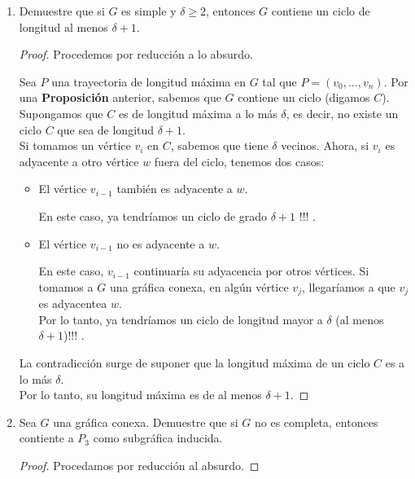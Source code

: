 \documentclass{article}
\begin{document}
\begin{enumerate}
\item Demuestre que si $G$ es simple y $\delta \ge 2$, entonces $G$ contiene
  un ciclo de longitud al menos $\delta + 1$.

  \begin{proof}
    Procedemos por reducción a lo absurdo.

    Sea $P$ una trayectoria de longitud máxima en $G$ tal que $P = (v_{0}, \dots, v_{n})$.
    Por una \textbf{Proposición} anterior, sabemos que $G$ contiene un ciclo (digamos $C$). \\
    Supongamos que $C$ es de longitud máxima a lo más $\delta$, es decir, no existe un ciclo $C$
    que sea de longitud $\delta + 1$. \\
    Si tomamos un vértice $v_{i}$ en $C$, sabemos que tiene $\delta$ vecinos. Ahora, si $v_{i}$ es
    adyacente a otro vértice $w$ fuera del ciclo, tenemos dos casos:
    \begin{itemize}
      \item El vértice $v_{i-1}$ también es adyacente a $w$.

        En este caso, ya tendríamos un ciclo de grado $\delta + 1$ !!! .

      \item El vértice $v_{i-1}$ no es adyacente a $w$.

        En este caso, $v_{i-1}$ continuaría su adyacencia por otros vértices. Si tomamos a $G$
        una gráfica conexa, en algún vértice $v_{j}$, llegaríamos a que $v_{j}$ es adyacentea $w$. \\
        Por lo tanto, ya tendríamos un ciclo de longitud mayor a $\delta$ (al menos $\delta + 1$)!!! .
    \end{itemize}

    La contradicción surge de suponer que la longitud máxima de un ciclo $C$ es a lo más $\delta$. \\
    Por lo tanto, su longitud máxima es de al menos $\delta + 1$.

  \end{proof}
\item Sea $G$ una gr\'afica conexa.   Demuestre que si $G$ no es completa,
  entonces contiente a $P_3$ como subgr\'afica inducida.
  \renewcommand\qedsymbol{QED}
  \begin{proof}
    Procedamos por reducción al absurdo.


\end{proof}
\end{enumerate}
\end{document}
